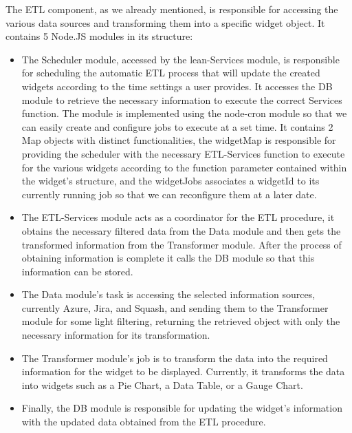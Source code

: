 \documentclass[a4paper,twoside,10pt]{report}
\begin{document}
The ETL component, as we already mentioned, is responsible for accessing the various data sources and transforming them into a specific widget object.
\newline
It contains 5 Node.JS modules in its structure:
\begin{itemize}
  \item The Scheduler module, accessed by the lean-Services module, is responsible for scheduling the automatic ETL process that will update the created widgets according to the time settings a user provides. It accesses the DB module to retrieve the necessary information to execute the correct Services function.
\newline
The module is implemented using the node-cron\cite{NODECRON} module so that we can easily create and configure jobs to execute at a set time.
It contains 2 Map objects with distinct functionalities, the widgetMap is responsible for providing the scheduler with the necessary ETL-Services function to execute for the various widgets according to the function parameter contained within the widget's structure, and the widgetJobs associates a widgetId to its currently running job so that we can reconfigure them at a later date.
  \item The ETL-Services module acts as a coordinator for the ETL procedure, it obtains the necessary filtered data from the Data module and then gets the transformed information from the Transformer module.
\newline
After the process of obtaining information is complete it calls the DB module so that this information can be stored.
  \item The Data module's task is accessing the selected information sources, currently Azure, Jira, and Squash, and sending them to the Transformer module for some light filtering, returning the retrieved object with only the necessary information for its transformation.
  \item The Transformer module's job is to transform the data into the required information for the widget to be displayed. Currently, it transforms the data into widgets such as a Pie Chart, a Data Table, or a Gauge Chart.
  \item Finally, the DB module is responsible for updating the widget's information with the updated data obtained from the ETL procedure.
\end{itemize}

\newpage
\end{document}
